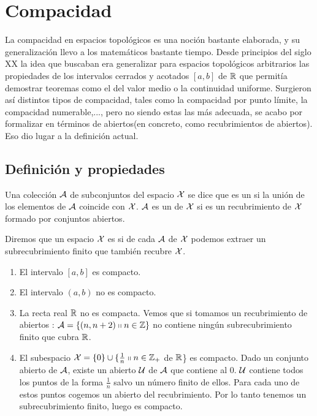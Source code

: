 \chapter{Compacidad}
\label{comp}

La compacidad en espacios topológicos es una noción bastante elaborada, y su generalización llevo a los matemáticos bastante tiempo. Desde principios del siglo XX la idea que buscaban era generalizar para espacios topológicos arbitrarios las propiedades de los intervalos cerrados y acotados $[a,b]$ de $\mathbb{R}$ que permitía demostrar teoremas como el del valor medio o la continuidad uniforme. Surgieron así distintos tipos de compacidad, tales como la compacidad por punto límite, la compacidad numerable,...,  pero no siendo estas las más adecuada, se acabo por formalizar en términos de abiertos(en concreto, como recubrimientos de abiertos). Eso dio lugar a la definición actual.

\section{Definición y propiedades}

\begin{defi}
	Una colección $\mathcal{A}$ de subconjuntos del espacio $\mathcal{X}$ se dice que es un  si la unión de los elementos de $\mathcal{A}$ coincide con $\mathcal{X}$. $\mathcal{A}$ es un  de $\mathcal{X}$ si es un recubrimiento de $\mathcal{X}$ formado por conjuntos abiertos.
\end{defi}

\begin{defi}[Compacto]
	Diremos que un espacio $\mathcal{X}$ es  si de cada  $\mathcal{A}$ de $\mathcal{X}$ podemos extraer un subrecubrimiento finito que también recubre $\mathcal{X}$.
\end{defi}

\begin{exa}
	\begin{enumerate}
		\item El intervalo $[a,b]$ es compacto.
		\item El intervalo $(a,b)$ no es compacto.
		\item La recta real $\mathbb{R}$ no es compacta. Vemos que si tomamos un recubrimiento de abiertos : $\mathcal{A}=\{(n,n+2) \shortparallel n \in \mathbb{Z}\}$ no contiene ningún subrecubrimiento finito que cubra $\mathbb{R}$.
		\item El subespacio $\mathcal{X} = \{0\} \cup \{\frac{1}{n} \shortparallel n \in \mathbb{Z}_{+}$ de $\mathbb{R}$\} es compacto.
		Dado un conjunto abierto de $\mathcal{A}$, existe un abierto $\mathcal{U}$ de $\mathcal{A}$ que contiene al $0$. $\mathcal{U}$ contiene todos los puntos de la forma $\frac{1}{n}$ salvo un número finito de ellos. Para cada uno de estos puntos cogemos un abierto del recubrimiento. Por lo tanto tenemos un subrecubrimiento finito, luego es compacto. 
	\end{enumerate}
\end{exa}

